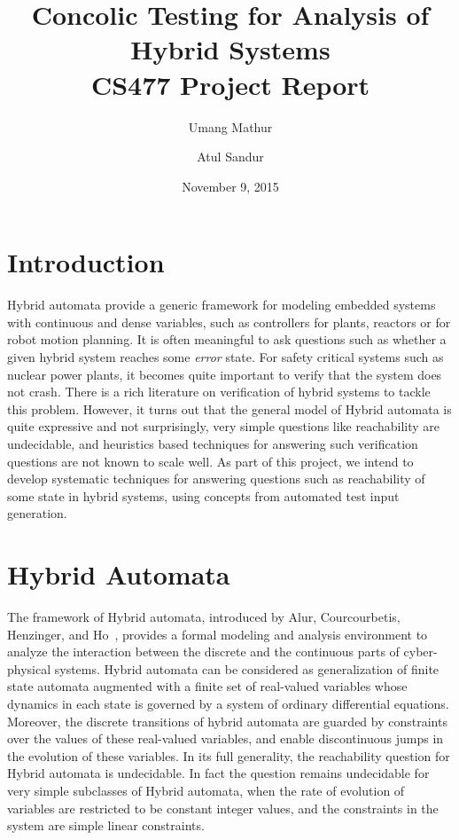 

\title{Concolic Testing for Analysis of Hybrid Systems  \\
\large CS477 Project Report}
\author{Umang Mathur \and Atul Sandur}
\date{November 9, 2015}



\maketitle

\section{Introduction}
Hybrid automata provide a generic framework for modeling embedded systems with continuous and dense variables, such as controllers for plants, reactors or for robot motion planning.
It is often meaningful to ask questions such as whether a given hybrid system reaches some \emph{error} state. For safety critical systems such as nuclear power plants, it becomes quite important to verify that the system does not crash. There is a rich literature on verification of hybrid systems to tackle this problem. However, it turns out that the general model of Hybrid automata is quite expressive and not surprisingly, very simple questions like reachability are undecidable, and heuristics based techniques for answering such verification questions are not known to scale well.
As part of this project, we intend to develop systematic techniques for answering questions such as reachability of some state in hybrid systems, using concepts from automated test input generation.

\section{Hybrid Automata}
The framework of Hybrid automata, introduced by Alur, Courcourbetis, Henzinger, and Ho~\cite{ACH92}, provides a formal modeling and analysis environment to analyze the interaction between the discrete and the continuous parts of cyber-physical systems. Hybrid automata can be considered as generalization of finite state automata augmented with a finite set of real-valued variables whose dynamics in each state is governed by a system of ordinary differential equations. Moreover, the discrete transitions of hybrid automata are guarded by constraints over the values of these real-valued variables, and enable discontinuous jumps in the evolution of these variables. 
In its full generality, the reachability question for Hybrid automata is undecidable. In fact the question remains undecidable for very simple subclasses of Hybrid automata, when the rate of evolution of variables are restricted to be constant integer values, and the constraints in the system are simple linear constraints.



